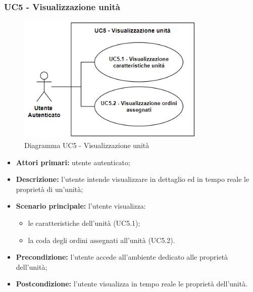 \subsubsection{UC5 - Visualizzazione unità}
    \begin{figure}[h!]
        \centering
        \includegraphics[width=9cm]{images/uc5.png}  
        \caption{Diagramma UC5 - Visualizzazione unità}
    \end{figure}
    \begin{itemize}
        \item \textbf{Attori primari:} utente autenticato;
        \item \textbf{Descrizione:} l'utente intende visualizzare in dettaglio ed in tempo reale le proprietà di un'unità;
        \item \textbf{Scenario principale:} l'utente visualizza:
        \begin{itemize}
            \item le caratteristiche dell'unità (UC5.1);
            \item la coda degli ordini assegnati all'unità (UC5.2).
        \end{itemize}
        \item \textbf{Precondizione:} l'utente accede all'ambiente dedicato alle proprietà dell'unità;
        \item \textbf{Postcondizione:} l'utente visualizza in tempo reale le proprietà dell'unità.
    \end{itemize}

